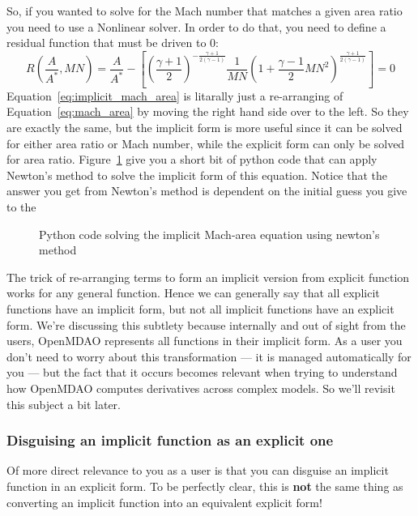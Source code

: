 \documentclass[conf]{new-aiaa}
\begin{document}
    So, if you wanted to solve for the Mach number that matches a given area ratio you need to use a Nonlinear solver. 
    In order to do that, you need to define a residual function that must be driven to 0: 
    \begin{equation}
        R(\frac{A}{A^*}, MN) = \frac{A}{A^*} - \left[ \left(\frac{\gamma+1}{2}\right)^{-\frac{\gamma+1}{2(\gamma-1)}} 
                        \frac{1}{MN} 
                        \left( 1 + \frac{\gamma-1}{2}MN^2 \right)^{\frac{\gamma+1}{2(\gamma-1)}}\right] = 0
                        \label{eq:implicit_mach_area}
    \end{equation}
    Equation~\eqref{eq:implicit_mach_area} is litarally just a re-arranging of Equation~\eqref{eq:mach_area} by moving the right hand side over to the left. 
    So they are exactly the same, but the implicit form is more useful since it can be solved for either area ratio or Mach number, while the explicit form can only be solved for area ratio. 
    Figure~\ref{fig:mach-area-implicit} give you a short bit of python code that can apply Newton's method to solve the implicit form of this equation. 
    Notice that the answer you get from Newton's method is dependent on the initial guess you give to the
    \begin{figure}[H]
        \centering
        
        \caption{Python code solving the implicit Mach-area equation using newton's method}
        \label{fig:mach-area-implicit}
    \end{figure}

    The trick of re-arranging terms to form an implicit version from explicit function works for any general function.
    Hence we can generally say that all explicit functions have an implicit form, but not all implicit functions have an explicit form. 
    We're discussing this subtlety because internally and out of sight from the users, OpenMDAO represents all functions in their implicit form. 
    As a user you don't need to worry about this transformation --- it is managed automatically for you --- but the fact that it occurs becomes relevant when trying to understand how OpenMDAO computes derivatives across complex models.  
    So we'll revisit this subject a bit later. 


    \subsubsection{Disguising an implicit function as an explicit one}
    Of more direct relevance to you as a user is that you can disguise an implicit function in an explicit form. 
    To be perfectly clear, this is \textbf{not} the same thing as converting an implicit function into an equivalent explicit form! 
\end{document}
